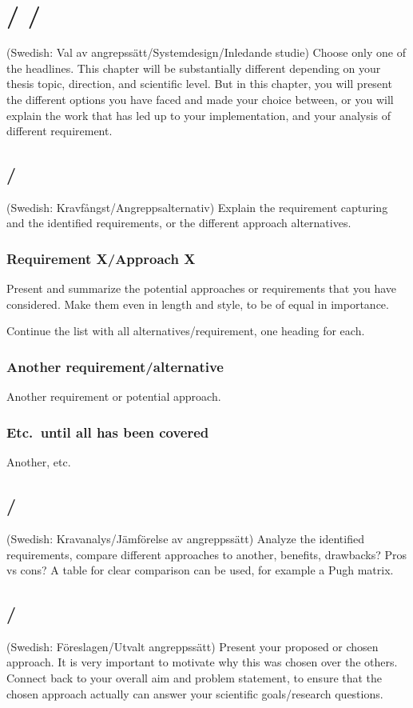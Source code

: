 \section{ /  / }\label{sec:prestudy} 
(Swedish: Val av angrepssätt/Systemdesign/Inledande studie) Choose only one of the headlines. This chapter will be substantially different depending on your thesis topic, direction, and scientific level. But in this chapter, you will present the different options you have faced and made your choice between, or you will explain the work that has led up to your implementation, and your analysis of different requirement.      

\subsection{/}
(Swedish: Kravfångst/Angreppsalternativ) Explain the requirement capturing and the identified requirements, or the different approach alternatives.

\subsubsection{Requirement X/Approach X}
Present and summarize the potential approaches or requirements that you have considered. Make them even in length and style, to be of equal in importance.

Continue the list with all alternatives/requirement, one heading for each.

\subsubsection{Another requirement/alternative}
Another requirement or potential approach.

\subsubsection{Etc.\ until all has been covered}
Another, etc.

\subsection{/}
(Swedish: Kravanalys/Jämförelse av angreppssätt) Analyze the identified requirements, compare different approaches to another, benefits, drawbacks? Pros vs cons? A table for clear comparison can be used, for example a Pugh matrix.

\subsection{/}
(Swedish: Föreslagen/Utvalt angreppssätt) Present your proposed or chosen approach. It is very important to motivate why this was chosen over the others. Connect back to your overall aim and problem statement, to ensure that the chosen approach actually can answer your scientific goals/research questions.